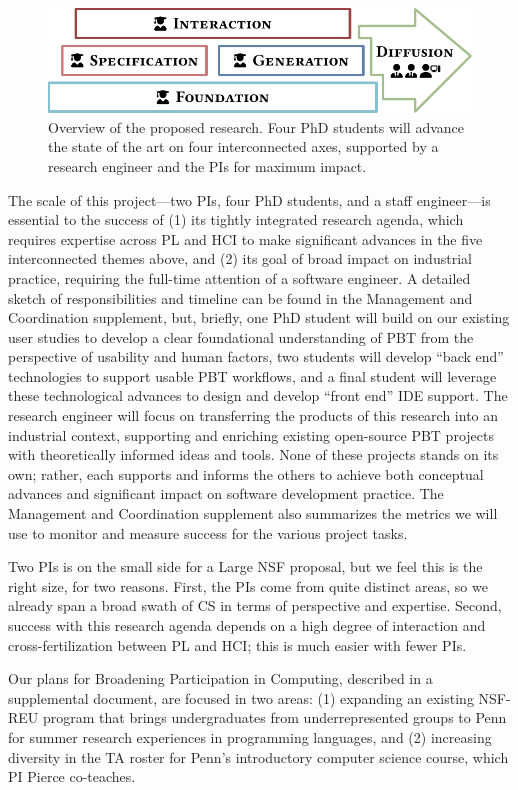 %
\begin{figure}
  \centering
  \includegraphics[width=.6\textwidth]{assets/overview.pdf}
  \caption{Overview of the proposed research. Four PhD students
  will advance the state of the art on four interconnected axes, supported by a
  research engineer and the PIs for maximum impact.}
  \label{overview}
\end{figure}
%
The scale of this project---two PIs, four PhD students, and a staff
engineer---is essential to the success of (1) its
tightly integrated research agenda, which requires expertise across PL and
HCI to make significant advances in the five interconnected themes above, and (2) its
goal of broad impact on industrial
practice, requiring the full-time attention of a software engineer.
%
A detailed sketch of responsibilities and timeline can be found in the
Management and Coordination supplement, but, briefly,
one PhD student will build on our existing user studies to
develop a clear foundational understanding of
PBT from the perspective of usability and human factors, two students
will develop ``back end'' technologies to support usable
PBT workflows, and a final student will leverage these technological
advances to design and develop ``front end'' IDE support. The
research engineer will focus on transferring the
products of this research into an industrial context, supporting and enriching
existing open-source PBT projects with theoretically informed ideas
and tools. None of these
projects stands on its own; rather, each supports and informs the
others to achieve both conceptual advances and significant
impact on software development practice.
%
The Management and Coordination supplement also summarizes the metrics
we will use to monitor and measure success for the various project
tasks.

Two PIs is on the small side for a Large NSF proposal, but  we feel this
is the right size, for two reasons. First, the PIs
come from quite distinct areas, so we already span a
broad swath of CS in terms of perspective and expertise.  Second,
success with this research agenda depends on a high degree of
interaction and cross-fertilization between PL and HCI; this is much
easier with fewer PIs.

Our plans for Broadening Participation in Computing, described in a
supplemental document, are focused in two areas: (1) expanding an
existing NSF-REU program that brings undergraduates from
underrepresented groups to Penn for summer research experiences in
programming languages, and (2) increasing diversity in the TA roster
for Penn's introductory computer science course, which PI Pierce
co-teaches.

